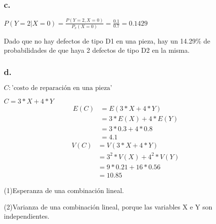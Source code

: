 \documentclass[12pt,fleqn]{article}
\begin{document}
\subsubsection*{c.}
$P(Y=2|X=0)=\frac{P(Y=2,X=0)}{P_x(X=0)}=\frac{0.1}{0.7}=0.1429$

Dado que no hay defectos de tipo D1 en una pieza, hay un 14.29\% de probabilidades de que haya 2 defectos de tipo D2 en la misma.
\subsubsection*{d.}
$C: \textrm{'costo de reparación en una pieza'}$

$C=3*X+4*Y$
\begin{align*}
  E(C)&=E(3*X+4*Y)\\
      &=3*E(X)+4*E(Y)\tag{1}\\
      &=3*0.3+4*0.8\\
      &=4.1
\end{align*}
\begin{align*}
  V(C)&=V(3*X+4*Y)\\
      &=3^2*V(X)+4^2*V(Y)\tag{2}\\
      &=9*0.21+16*0.56\\
      &=10.85
\end{align*}

(1)Esperanza de una combinación lineal.

(2)Varianza de una combinación lineal, porque las variables X e Y son independientes.
\end{document}
